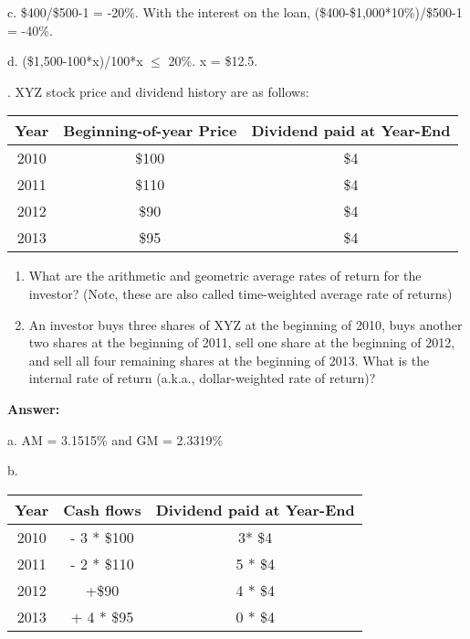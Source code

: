 \documentclass[11.5pt]{article}
\begin{document}
c. \$400/\$500-1 = -20\%. With the interest on the loan, (\$400-\$1,000*10\%)/\$500-1 = -40\%. 

d. (\$1,500-100*x)/100*x $\le$ 20\%. x = \$12.5.



\vspace{40pt}



. XYZ stock price and dividend history are as follows:

\begin{table}[h]
	\begin{tabular}{ccc}
		\hline
		Year & Beginning-of-year Price & Dividend paid at   Year-End \\ \hline
		2010 & \$100                   & \$4                         \\
		2011 & \$110                   & \$4                         \\
		2012 & \$90                    & \$4                         \\
		2013 & \$95                    & \$4                         \\ \hline
	\end{tabular}
\end{table}  


\begin{enumerate}[a]
	\item What are the arithmetic and geometric average rates of return for the investor? (Note, these are also called time-weighted average rate of returns)
	
	\item An investor buys three shares of XYZ at the beginning of 2010, buys another two shares at the beginning of 2011, sell one share at the beginning of 2012, and sell all four remaining shares at the beginning of 2013. What is the internal rate of return (a.k.a., dollar-weighted rate of return)? 
		
\end{enumerate}


\vspace{10pt}

\indent \textbf{Answer:} 

a. AM = 3.1515\% and GM = 2.3319\%

b. 
\begin{table}[h]
	\begin{tabular}{ccc}
		\hline
		Year & Cash flows & Dividend paid at   Year-End \\ \hline
		2010 & - 3 * \$100              & 3* \$4                         \\
		2011 & - 2 * \$110              & 5 * \$4                         \\
		2012 & +\$90                    & 4 * \$4                         \\
		2013 & + 4 * \$95               & 0 * \$4                         \\ \hline
	\end{tabular}
\end{table}  
\end{document}
